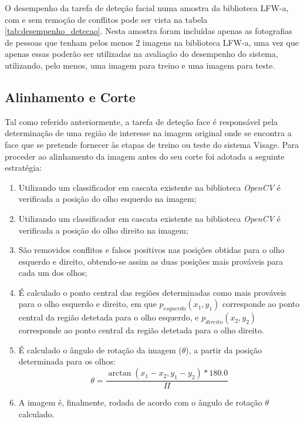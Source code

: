 O desempenho da tarefa de deteção facial numa amostra da biblioteca LFW-a, com e sem remoção de conflitos pode ser vista na tabela \ref{tab:desempenho_detecao}. Nesta amostra foram incluídas apenas as fotografias de pessoas que tenham pelos menos 2 imagens na biblioteca LFW-a, uma vez que apenas essas poderão ser utilizadas na avaliação do desempenho do sistema, utilizando, pelo menos, uma imagem para treino e uma imagem para teste.

\subsection{Alinhamento e Corte} \label{alinhamentoEcorte}
Tal como referido anteriormente, a tarefa de deteção face é responsável pela determinação de uma região de interesse na imagem original onde se encontra a face que se pretende fornecer às etapas de treino ou teste do sistema Visage.
Para proceder ao alinhamento da imagem antes do seu corte foi adotada a seguinte estratégia:
\begin{enumerate}
\item Utilizando um classificador em cascata existente na biblioteca \textit{OpenCV} é verificada a posição do olho esquerdo na imagem;
\item Utilizando um classificador em cascata existente na biblioteca \textit{OpenCV} é verificada a posição do olho direito na imagem;
\item São removidos conflitos e falsos positivos nas posições obtidas para o olho esquerdo e direito, obtendo-se assim as duas posições mais prováveis para cada um dos olhos;
\item É calculado o ponto central das regiões determinadas como mais prováveis para o olho esquerdo e direito, em que $p_{esquerdo}(x_1,y_1)$ corresponde ao ponto central da região detetada para o olho esquerdo, e  $p_{direito}(x_2,y_2)$ corresponde ao ponto central da região detetada para o olho direito.
\item É calculado o ângulo de rotação da imagem ($\theta$), a partir da posição determinada para os olhos:
\begin{equation}
\theta = \frac{\arctan(x_1 - x_2, y_1 - y_2) * 180.0}{\Pi}
\end{equation}
\item A imagem é, finalmente, rodada de acordo com o ângulo de rotação $\theta$ calculado.
\end{enumerate}


